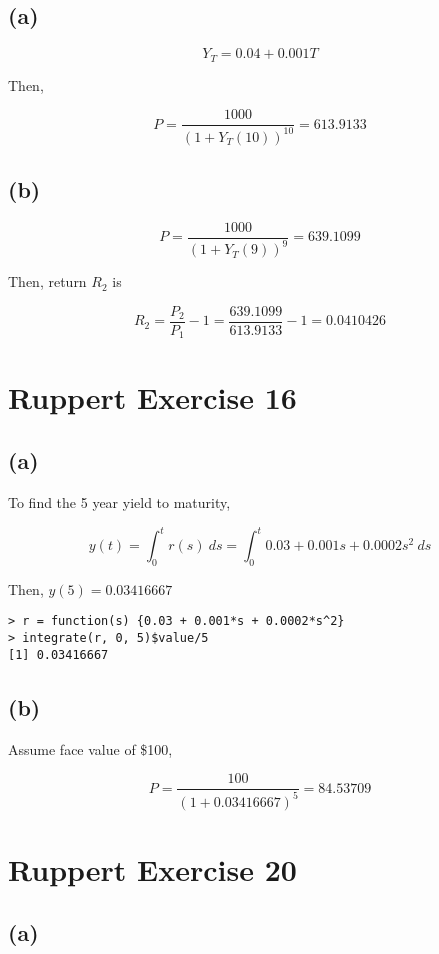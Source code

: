 \documentclass[11pt]{scrartcl}
\begin{document}
\subsection*{(a)}

\[Y_T = 0.04 + 0.001T\]

Then,

\[P = \frac{1000}{(1+Y_T(10))^{10}} = 613.9133\]

\subsection*{(b)}

\[P = \frac{1000}{(1+Y_T(9))^9} = 639.1099\]

Then, return $R_2$ is

\[R_2 = \frac{P_2}{P_1} - 1 = \frac{639.1099}{613.9133} - 1 = 0.0410426\]

\section*{Ruppert Exercise 16}

\subsection*{(a)}

To find the 5 year yield to maturity,

\[y(t) = \int_0^t r(s) \: ds = \int_0^t 0.03 + 0.001s + 0.0002s^2 \: ds\]

Then, $y(5) = 0.03416667$

\begin{lstlisting}
> r = function(s) {0.03 + 0.001*s + 0.0002*s^2}
> integrate(r, 0, 5)$value/5
[1] 0.03416667
\end{lstlisting}

\subsection*{(b)}

Assume face value of \$100,

\[P = \frac{100}{(1+0.03416667)^5} = 84.53709\]

\section*{Ruppert Exercise 20}

\subsection*{(a)}
\end{document}
